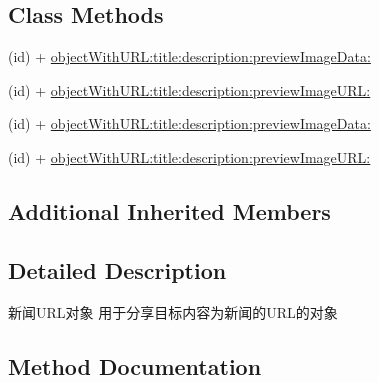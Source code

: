 \subsection*{Class Methods}
\begin{DoxyCompactItemize}
\item 
(id) + \mbox{\hyperlink{interface_q_q_api_news_object_a6020ebc347348a8e4c51e3ec47258b15}{object\+With\+U\+R\+L\+:title\+:description\+:preview\+Image\+Data\+:}}
\item 
(id) + \mbox{\hyperlink{interface_q_q_api_news_object_a99e56670b9789ab147236bada2101c94}{object\+With\+U\+R\+L\+:title\+:description\+:preview\+Image\+U\+R\+L\+:}}
\item 
(id) + \mbox{\hyperlink{interface_q_q_api_news_object_a6020ebc347348a8e4c51e3ec47258b15}{object\+With\+U\+R\+L\+:title\+:description\+:preview\+Image\+Data\+:}}
\item 
(id) + \mbox{\hyperlink{interface_q_q_api_news_object_a99e56670b9789ab147236bada2101c94}{object\+With\+U\+R\+L\+:title\+:description\+:preview\+Image\+U\+R\+L\+:}}
\end{DoxyCompactItemize}
\subsection*{Additional Inherited Members}


\subsection{Detailed Description}
新闻\+U\+R\+L对象 用于分享目标内容为新闻的\+U\+R\+L的对象 

\subsection{Method Documentation}
\mbox{\label{interface_q_q_api_news_object_a6020ebc347348a8e4c51e3ec47258b15}} 

